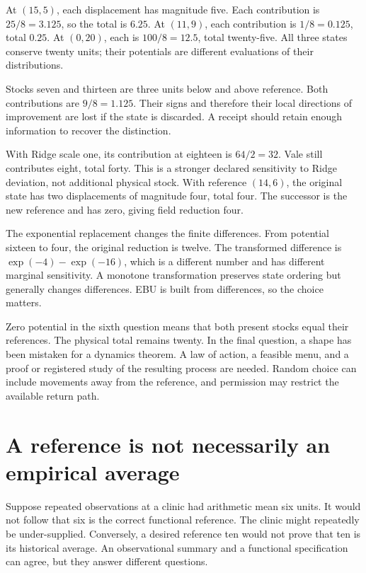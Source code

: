 At \((15,5)\), each displacement has magnitude five. Each contribution is \(25/8=3.125\), so the total is \(6.25\). At \((11,9)\), each contribution is \(1/8=0.125\), total \(0.25\). At \((0,20)\), each is \(100/8=12.5\), total twenty-five. All three states conserve twenty units; their potentials are different evaluations of their distributions.

Stocks seven and thirteen are three units below and above reference. Both contributions are \(9/8=1.125\). Their signs and therefore their local directions of improvement are lost if the state is discarded. A receipt should retain enough information to recover the distinction.

With Ridge scale one, its contribution at eighteen is \(64/2=32\). Vale still contributes eight, total forty. This is a stronger declared sensitivity to Ridge deviation, not additional physical stock. With reference \((14,6)\), the original state has two displacements of magnitude four, total four. The successor is the new reference and has zero, giving field reduction four.

The exponential replacement changes the finite differences. From potential sixteen to four, the original reduction is twelve. The transformed difference is \(\exp(-4)-\exp(-16)\), which is a different number and has different marginal sensitivity. A monotone transformation preserves state ordering but generally changes differences. EBU is built from differences, so the choice matters.

Zero potential in the sixth question means that both present stocks equal their references. The physical total remains twenty. In the final question, a shape has been mistaken for a dynamics theorem. A law of action, a feasible menu, and a proof or registered study of the resulting process are needed. Random choice can include movements away from the reference, and permission may restrict the available return path.

\section{A reference is not necessarily an empirical average}

Suppose repeated observations at a clinic had arithmetic mean six units. It would not follow that six is the correct functional reference. The clinic might repeatedly be under-supplied. Conversely, a desired reference ten would not prove that ten is its historical average. An observational summary and a functional specification can agree, but they answer different questions.

